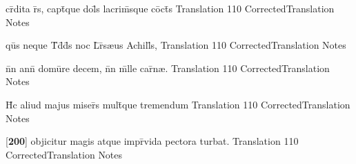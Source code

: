 \latline
  {cr\={}dita r\={}s, capt\={\macron {\i}}que dol\={\macron {\i}}s lacrim\={\macron {\i}}sque co\={}ct\={\macron {\i}}s}
  { Translation }
  {110}
  { CorrectedTranslation }
  { Notes }


\latline
  {qu\={}s neque T\={}d\={\macron {\i}}d\={}s noc L\={}r\={\macron {\i}}s{\ae}us Achill\={}s,}
  { Translation }
  {110}
  { CorrectedTranslation }
  { Notes }


\latline
  {n\={}n ann\={\macron {\i}} domu\={}re decem, n\={}n m\={\macron {\i}}lle car\={\macron {\i}}n{\ae}.}
  { Translation }
  {110}
  { CorrectedTranslation }
  { Notes }


\latline
  {H\={\macron {\i}}c aliud majus miser\={\macron {\i}}s mult\={}que tremendum}
  { Translation }
  {110}
  { CorrectedTranslation }
  { Notes }


\latline
  {[\textbf{200}] objicitur magis atque impr\={}vida pectora turbat.}
  { Translation }
  {110}
  { CorrectedTranslation }
  { Notes }


